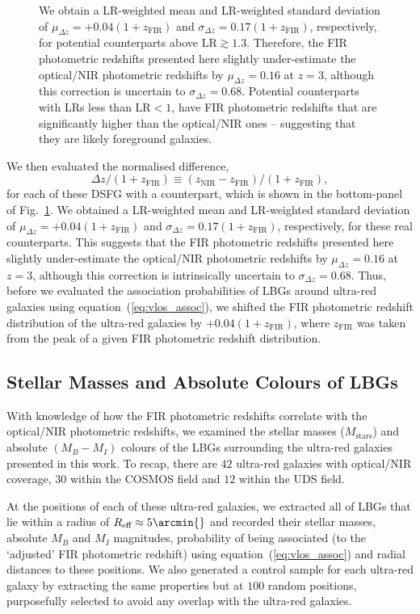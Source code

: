 \documentclass[a4paper, fleqn, usenatbib]{mnras}
\newcommand{\mstars}{M_{\text{stars}}}
\newcommand{\reff}{R_{\text{eff}}}
\newcommand{\urg}{ultra-red galaxy}
\newcommand{\urgs}{ultra-red galaxies}
\newcommand{\znir}{z_{\text{NIR}}}
\newcommand{\zfir}{z_{\text{FIR}}}
\begin{document}
\begin{figure}
{    We obtain a LR-weighted mean and LR-weighted standard deviation of $\mu_{\Delta z}=+0.04(1+\zfir)$ and $\sigma_{\Delta z}=0.17(1+\zfir)$, respectively, for potential counterparts above $\text{LR}\gtrsim1.3$.
    Therefore, the FIR photometric redshifts presented here slightly under-estimate the optical/NIR photometric redshifts by $\mu_{\Delta z}=0.16$ at $z=3$, although this correction is uncertain to $\sigma_{\Delta z}=0.68$.
    Potential counterparts with LRs less than $\text{LR}<1$, have FIR photometric redshifts that are significantly higher than the optical/NIR ones -- suggesting that they are likely foreground galaxies.}
    \label{fig:likelihood_ratio}
\end{figure}

We then evaluated the normalised difference, $$\Delta z / (1+\zfir{}) \equiv (\znir{}-\zfir{})/(1+\zfir{}),$$ for each of these DSFG with a counterpart, which is shown in the bottom-panel of Fig.~\ref{fig:likelihood_ratio}.
We obtained a LR-weighted mean and LR-weighted standard deviation of $\mu_{\Delta z}=+0.04(1+\zfir{})$ and $\sigma_{\Delta z}=0.17(1+\zfir{})$, respectively, for these real counterparts.
This suggests that the FIR photometric redshifts presented here slightly under-estimate the optical/NIR photometric redshifts by $\mu_{\Delta z}=0.16$ at $z=3$, although this correction is intrinsically uncertain to $\sigma_{\Delta z}=0.68$.
Thus, before we evaluated the association probabilities of LBGs around \urgs{} using equation~(\ref{eq:vlos_assoc}), we shifted the FIR photometric redshift distribution of the \urgs{} by $+0.04(1+\zfir{})$, where $\zfir{}$ was taken from the peak of a given FIR photometric redshift distribution.

\subsection{Stellar Masses and Absolute Colours of LBGs}

With knowledge of how the FIR photometric redshifts correlate with the optical/NIR photometric redshifts, we examined the stellar masses ($\mstars{}$) and absolute $(M_B - M_I)$ colours of the LBGs surrounding the \urgs{} presented in this work.
To recap, there are $42$ \urgs{} with optical/NIR coverage, $30$ within the COSMOS field and $12$ within the UDS field.

At the positions of each of these \urgs{}, we extracted all of LBGs that lie within a radius of $\reff{}\approx5\arcmin{}$ and recorded their stellar masses, absolute $M_{B}$ and $M_{I}$ magnitudes, probability of being associated (to the `adjusted' FIR photometric redshift) using equation~(\ref{eq:vlos_assoc}) and radial distances to these positions.
We also generated a control sample for each \urg{} by extracting the same properties but at $100$ random positions, purposefully selected to avoid any overlap with the \urgs{}.
\end{document}
